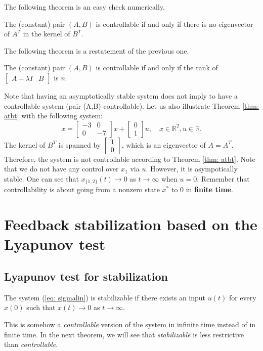 The following theorem is an easy check numerically.
\begin{theorem}
	\label{thm: atbt}
	The (constant) pair $(A,B)$ is controllable if and only if there is no eigenvector of $A^T$ in the kernel of $B^T$.
\end{theorem}
The following theorem is a restatement of the previous one.
\begin{theorem}
	The (constant) pair $(A,B)$ is controllable if and only if the rank of $\begin{bmatrix}A-\lambda I & B\end{bmatrix}$ is $n$.
\end{theorem}

\begin{remark}
	Note that having an asymptotically stable system does not imply to have a controllable system (pair (A,B) controllable). Let us also illustrate Theorem \ref{thm: atbt} with the following system:
\begin{equation}
	\dot x = \begin{bmatrix}-3 & 0 \\ 0 & -7\end{bmatrix}x + \begin{bmatrix}0 \\ 1\end{bmatrix}u, \quad x\in\mathbb{R}^2, u\in\mathbb{R}.
\end{equation}
	The kernel of $B^T$ is spanned by $\begin{bmatrix}1 \\ 0\end{bmatrix}$, which is an eigenvector of $A = A^T$. Therefore, the system is not controllable according to Theorem \ref{thm: atbt}. Note that we do not have any control over $x_1$ via $u$. However, it is asympotically stable. One can see that $x_{\{1,2\}}(t) \to 0$ as $t\to\infty$ when $u = 0$. Remember that controllability is about going from a nonzero state $x^*$ to $0$ in \textbf{finite time}.
\end{remark}

\section{Feedback stabilization based on the Lyapunov test}
\subsection{Lyapunov test for stabilization}
\begin{definition}
The system (\ref{eq: sigmalin}) is stabilizable if there exists an input $u(t)$ for every $x(0)$ such that $x(t)\to 0$ as $t\to\infty$.
\end{definition}
This is somehow a \emph{controllable} version of the system in infinite time instead of in finite time. In the next theorem, we will see that \emph{stabilizable} is less restrictive than \emph{controllable}.

